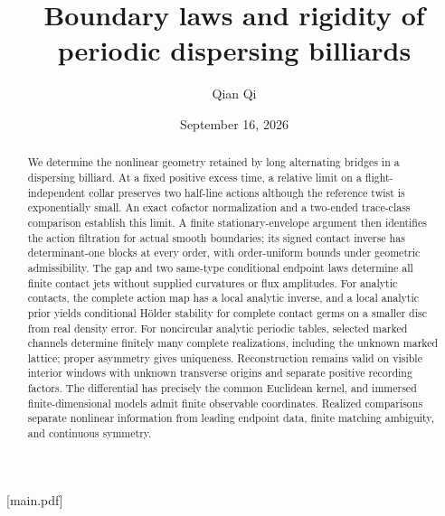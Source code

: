 
[main.pdf]
\title[Boundary laws and periodic rigidity]{Boundary laws and rigidity of periodic dispersing billiards}
\author{Qian Qi}
\date{September 16, 2026}


\begin{abstract}
We determine the nonlinear geometry retained by long alternating bridges
in a dispersing billiard.  At a fixed positive excess time, a relative
limit on a flight-independent collar preserves two half-line actions
although the reference twist is exponentially small.  An exact cofactor
normalization and a two-ended trace-class comparison establish this limit.
A finite stationary-envelope argument then identifies the action filtration
for actual smooth boundaries; its signed contact inverse has determinant-one
blocks at every order, with order-uniform bounds under geometric
admissibility.  The gap and two same-type conditional endpoint laws determine
all finite contact jets without supplied curvatures or flux amplitudes.
For analytic contacts, the complete action map has a local analytic inverse,
and a local analytic prior yields conditional H\"older stability for complete
contact germs on a smaller disc from real density error.
For noncircular analytic periodic tables, selected marked channels determine
finitely many complete realizations, including the unknown marked lattice;
proper asymmetry gives uniqueness.  Reconstruction remains valid on visible
interior windows with unknown transverse origins and separate positive
recording factors.  The differential has precisely the common Euclidean
kernel, and immersed finite-dimensional models admit finite observable
coordinates.  Realized comparisons separate nonlinear information from
leading endpoint data, finite matching ambiguity, and continuous symmetry.
\end{abstract}
\maketitle
\enlargethispage{2pt}
\setcounter{tocdepth}{1}
\tableofcontents

